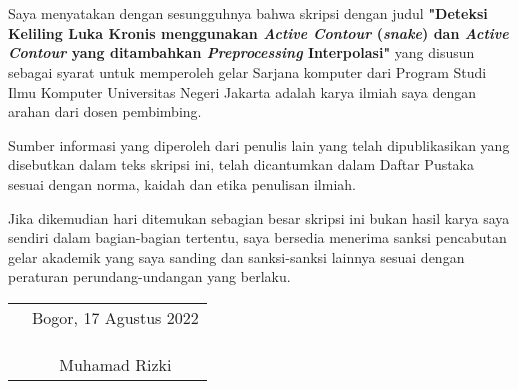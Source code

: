 \chapter*{}

Saya menyatakan dengan sesungguhnya bahwa skripsi dengan judul 	\textbf{"Deteksi Keliling Luka Kronis menggunakan \emph{Active Contour} (\emph{snake}) dan \emph{Active Contour} yang ditambahkan \emph{Preprocessing} Interpolasi"} yang disusun sebagai syarat untuk memperoleh gelar Sarjana komputer dari Program Studi Ilmu Komputer Universitas Negeri Jakarta adalah karya ilmiah saya dengan arahan dari dosen pembimbing.

Sumber informasi yang diperoleh dari penulis lain yang
telah dipublikasikan yang disebutkan dalam teks skripsi ini, telah dicantumkan dalam Daftar Pustaka sesuai dengan norma, kaidah dan etika penulisan ilmiah.

Jika dikemudian hari ditemukan sebagian besar skripsi ini bukan hasil karya saya sendiri dalam bagian-bagian tertentu, saya bersedia menerima sanksi pencabutan gelar akademik yang saya sanding dan sanksi-sanksi lainnya sesuai dengan peraturan perundang-undangan yang berlaku.

\vspace{.5cm}

\begin{tabular}{p{7.5cm}c}
	&Bogor, 17 Agustus 2022\\
	&\\
	&\\
	&\\
	&Muhamad Rizki
\end{tabular}